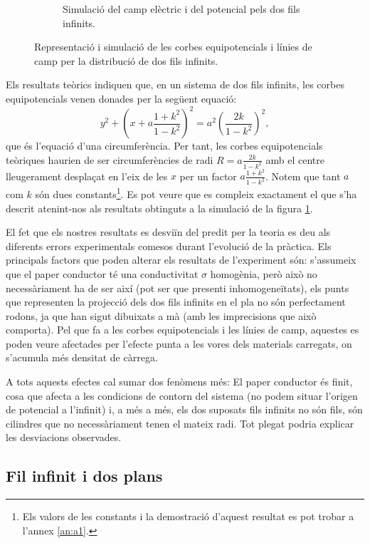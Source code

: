 \documentclass[a4paper,10.5pt]{report}
\begin{document}
\begin{figure}[h]
\begin{subfigure}{0.5\linewidth}
		\caption{Simulació del camp elèctric i del potencial pels dos fils infinits.}
		\label{fig:1.3b}
	\end{subfigure}
	\caption{Representació i simulació de les corbes equipotencials i línies de camp per la distribució de dos fils infinits.}
	\label{fig:1.3}
\end{figure}

Els resultats teòrics indiquen que, en un sistema de dos fils infinits, les corbes equipotencials venen donades per la següent equació:
\begin{equation}
	y^2+\left( x+a\frac{1+k^2}{1-k^2}\right)^2 = a^2\left( \frac{2k}{1-k^2}\right)^2  \label{eqsuppon},
\end{equation}
que és l'equació d'una circumferència. Per tant, les corbes equipotencials teòriques haurien de ser circumferències de radi $R = a\frac{2k}{1-k^2}$ amb el centre lleugerament desplaçat en l'eix de les $x$ per un factor $a\frac{1+k^2}{1-k^2}$. Notem que tant $a$ com $k$ són dues constants\footnote{Els valors de les constants i la demostració d'aquest resultat es pot trobar a l'annex \ref{an:a1}.}. Es pot veure que es compleix exactament el que s'ha descrit atenint-nos als resultats obtinguts a la simulació de la figura \ref{fig:1.3b}.

El fet que els nostres resultats es desviïn del predit per la teoria es deu als diferents errors experimentals comesos durant l'evolució de la pràctica. Els principals factors que poden alterar els resultats de l'experiment són: s'assumeix que el paper conductor té una conductivitat $\sigma$ homogènia, però això no necessàriament ha de ser així (pot ser que presenti inhomogeneïtats), els punts que representen la projecció dels dos fils infinits en el pla no són perfectament rodons, ja que han sigut dibuixats a mà (amb les imprecisions que això comporta). Pel que fa a les corbes equipotencials i les línies de camp, aquestes es poden veure afectades per l'efecte punta a les vores dels materials carregats, on s'acumula més densitat de càrrega. 

A tots aquests efectes cal sumar dos fenòmens més: El paper conductor és finit, cosa que afecta a les condicions de contorn del sistema (no podem situar l'origen de potencial a l'infinit) i, a més a més, els dos suposats fils infinits no són fils, són cilindres que no necessàriament tenen el mateix radi. Tot plegat podria explicar les desviacions observades.

\subsection{Fil infinit i dos plans}
\end{document}
